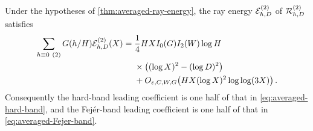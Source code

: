 \begin{proposition}
\label{prop:even-shift-ensemble}
Under the hypotheses of \cref{thm:averaged-ray-energy}, the ray energy
$\mathcal E^{(2)}_{h,D}$ of $\mathcal R^{(2)}_{h,D}$ satisfies
\begin{equation}
 \begin{aligned}
 \sum_{h\equiv0\ (2)}G(h/H)\mathcal E^{(2)}_{h,D}(X)
 ={}&\frac14HX I_0(G)I_2(W)\log H\\
 &\times\bigl((\log X)^2-(\log D)^2\bigr)\\
 &+O_{\varepsilon,C,W,G}\!\left(
 HX(\log X)^2\log\log(3X)\right).
 \end{aligned}
 \label{eq:even-shift-ray-energy}
\end{equation}
Consequently the hard-band leading coefficient is one half of that in
\eqref{eq:averaged-hard-band}, and the Fej\'er-band leading coefficient is
one half of that in \eqref{eq:averaged-Fejer-band}.
\end{proposition}

